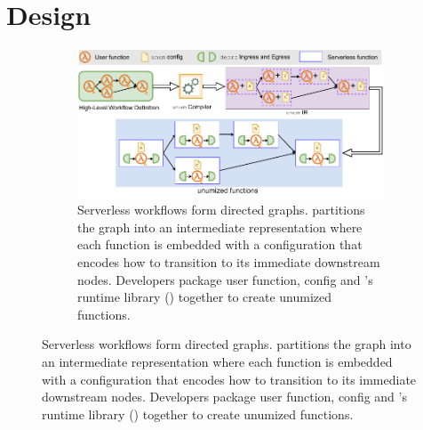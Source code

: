 \section{Design}

\begin{figure}[t]
	\centering
	\begin{subfigure}[t]{0.8\textwidth}
	\centering
		       \includegraphics[width=0.8\columnwidth]{figures/unum-arch-compile-time.pdf}
		\caption{Serverless workflows form directed graphs. \name{}
		partitions the graph into an intermediate representation where each
		function is embedded with a configuration that encodes how to
		transition to its immediate downstream nodes. Developers package user
		function, \name{} config and \name{}'s runtime library (\deorc{})
		together to create unumized functions.}
		\label{fig:arch:unum-compile-time}


\end{subfigure}
\end{figure}
